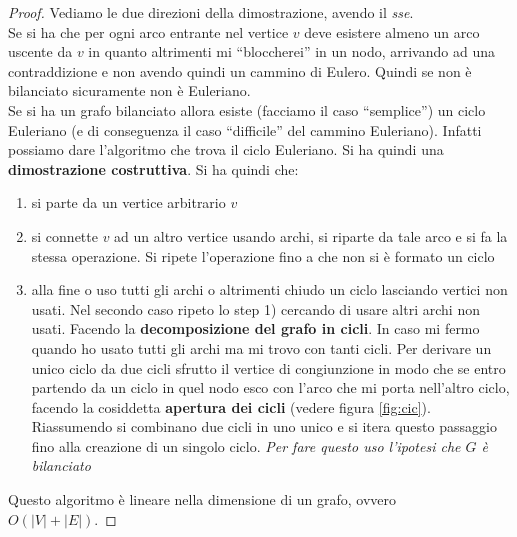 \documentclass[a4paper,12pt, oneside]{book}
\begin{document}
\begin{proof}
  Vediamo le due direzioni della dimostrazione, avendo il \textit{sse}.\\
  Se si ha che per ogni arco entrante nel vertice $v$ deve esistere almeno un
  arco uscente da $v$ in quanto altrimenti mi ``bloccherei'' in un nodo,
  arrivando ad una contraddizione e non avendo quindi un cammino di
  Eulero. Quindi se non è bilanciato sicuramente non è Euleriano.\\
  Se si ha un grafo bilanciato allora esiste (facciamo il caso ``semplice'') un
  ciclo Euleriano (e di conseguenza il caso ``difficile'' del cammino
  Euleriano). Infatti possiamo dare l'algoritmo che trova il ciclo Euleriano. Si
  ha quindi una \textbf{dimostrazione costruttiva}. Si ha quindi che:
  \begin{enumerate}
    \item si parte da un vertice arbitrario $v$
    \item si connette $v$ ad un altro vertice usando archi, si riparte da tale
    arco e si fa la stessa operazione. Si ripete l'operazione fino a che non si
    è formato un ciclo 
    \item alla fine o uso tutti gli archi o altrimenti chiudo un ciclo lasciando
    vertici non usati. Nel secondo caso ripeto lo step 1) cercando di usare
    altri archi non usati. Facendo la \textbf{decomposizione del grafo in
      cicli}. In caso mi fermo quando ho usato tutti gli archi ma mi trovo con
    tanti cicli. Per derivare un unico ciclo da due cicli sfrutto il vertice di
    congiunzione in modo che se entro partendo da un ciclo in quel nodo esco con
    l'arco che mi porta nell'altro ciclo, facendo la cosiddetta \textbf{apertura
      dei cicli} (vedere figura \ref{fig:cic}). \\
    Riassumendo si combinano due cicli in uno unico e si itera questo passaggio
    fino alla creazione di un singolo ciclo. \textit{Per fare questo uso
      l'ipotesi che $G$ è bilanciato}
  \end{enumerate}
  Questo algoritmo è lineare nella dimensione di un grafo, ovvero\\
  $O(|V|+|E|)$.  
\end{proof}
\end{document}
